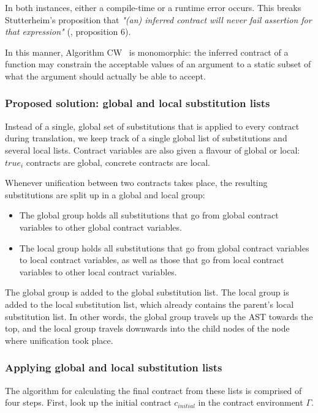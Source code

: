 \documentclass[10pt]{report}
\begin{document}
{In both instances, either a compile-time or a runtime error occurs.
This breaks Stutterheim's proposition that \textit{"(an) inferred contract will never fail assertion for that expression"} (\cite{Stutterheim:2013:thesis}, proposition 6). 

In this manner, Algorithm CW ~is monomorphic: the inferred contract of a function may constrain the acceptable values of an argument to a static subset of what the argument should actually be able to accept.

\subsubsection{Proposed solution: global and local substitution lists}

Instead of a single, global set of substitutions that is applied to every contract during translation, we keep track of a single global list of substitutions and several local lists.
Contract variables are also given a flavour of global or local: $true_i$ contracts are global, concrete contracts are local.

Whenever unification between two contracts takes place, the resulting substitutions are split up in a global and local group:
\begin{itemize}
\item The global group holds all substitutions that go from global contract variables to other global contract variables.
\item The local group holds all substitutions that go from global contract variables to local contract variables, as well as those that go from local contract variables to other local contract variables.
\end{itemize}

The global group is added to the global substitution list.
The local group is added to the local substitution list, which already contains the parent's local substitution list.
In other words, the global group travels up the AST towards the top, and the local group travels downwards into the child nodes of the node where unification took place.

\subsubsection{Applying global and local substitution lists}

The algorithm for calculating the final contract from these lists is comprised of four steps.
First, look up the initial contract $c_{initial}$ in the contract environment $\Gamma$.

}
\end{document}

